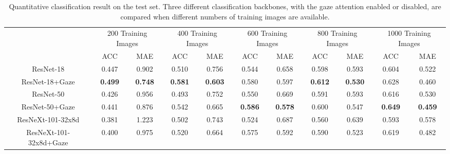 \begin{table*}[h]
\caption{Quantitative classification result on the test set. Three different classification backbones, with the gaze attention enabled or disabled, are compared when different numbers of training images are available.}
\label{different-backbone}
\centering
\begin{tabular}{ccccccccccc}
\hline
\multirow{2}{*}{} & \multicolumn{2}{c}{200 Training Images} & \multicolumn{2}{c}{400 Training Images} & \multicolumn{2}{c}{600 Training Images} & \multicolumn{2}{c}{800 Training Images} & \multicolumn{2}{c}{1000 Training Images} \\ \cline{2-11} 
                        & ACC           & MAE             & ACC           & MAE             & ACC           & MAE             & ACC           & MAE             & ACC            & MAE             \\ \hline
ResNet-18               & 0.447              & 0.902           & 0.510               & 0.756           & 0.544              & 0.658           & 0.598              & 0.593           & 0.604               & 0.522           \\ \hline
ResNet-18+Gaze           & \textbf{0.499}             & \textbf{0.748}           & \textbf{0.581}              & \textbf{0.603}           & 0.580              & 0.597           & \textbf{0.612}              & \textbf{0.530}            & 0.628               & 0.460            \\ \hline
ResNet-50               & 0.426              & 0.956           & 0.493              & 0.752           & 0.550              & 0.669           & 0.591              & 0.593           & 0.616               & 0.530            \\ \hline
ResNet-50+Gaze          & 0.441              & 0.876           & 0.542              & 0.665           & \textbf{0.586}              & \textbf{0.578}           & 0.600              & 0.547           & \textbf{0.649}               & \textbf{0.459}           \\ \hline
ResNeXt-101-32x8d       & 0.381              & 1.223           & 0.502              & 0.743           & 0.524              & 0.687           & 0.560              & 0.639           & 0.593               & 0.578           \\ \hline
ResNeXt-101-32x8d+Gaze  & 0.400              & 0.975           & 0.520              & 0.664           & 0.575              & 0.592           & 0.590              & 0.523           & 0.619               & 0.482           \\ \hline

\end{tabular}
\end{table*}
